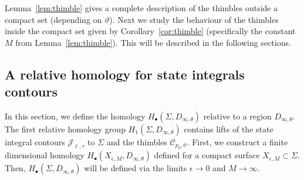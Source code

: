 \documentclass[12pt,reqno]{amsart}
\theoremstyle{definition}
\def\calC{\mathcal C}
\def\calJ{\mathcal J}
\renewcommand{\=}{\;=\;}
\begin{document}
Lemma~\ref{lem:thimble} gives a complete description of the thimbles outside a compact set (depending on $\vartheta$). Next we study the behaviour of the thimbles inside the compact set given by Corollary~\ref{cor:thimble} (specifically the constant $M$ from Lemma~\ref{lem:thimble}). This will be described in the following sections.

\subsection{A relative homology for state integrals contours}
%
In this section, we define the homology $H_\bullet(\Sigma,D_{\infty,\theta})$ relative to a region $D_{\infty,\theta}$. The first relative homology group $H_1(\Sigma,D_{\infty,\theta})$ contains lifts of the state integral contours $\calJ_{\ell,\tau}$ to $\Sigma$ and the thimbles $\calC_{p_0,\vartheta}$. First, we construct a finite dimensional homology $H_\bullet(X_{\epsilon,M},D_{\infty,\theta})$ defined for a compact surface $X_{\epsilon,M}\subset\Sigma$. Then, $H_\bullet(\Sigma,D_{\infty,\theta})$ will be defined via the limits $\epsilon\to0$ and $M\to\infty$.
% 
\end{document}
